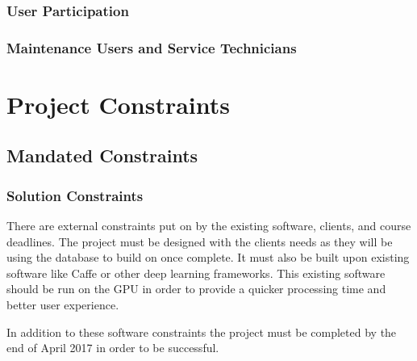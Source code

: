 \documentclass{scrreprt}
\begin{document}
\subsection{User Participation}

\subsection{Maintenance Users and Service Technicians}

\chapter{Project Constraints}

\section{Mandated Constraints}

\subsection{Solution Constraints}

There are external constraints put on by the existing software, clients, and
course deadlines. The project must be designed with the clients needs as they
will be using the database to build on once complete. It must also be built
upon existing software like Caffe or other deep learning frameworks. This
existing software should be run on the GPU in order to provide a quicker
processing time and better user experience.

In addition to these software constraints the project must be completed by the
end of April 2017 in order to be successful.
\end{document}
